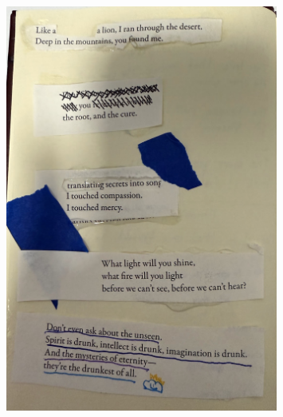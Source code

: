 \documentclass[12pt]{book}
\begin{document}
\begin{figure}
    \centering
    \includegraphics[width=0.8\textwidth]{figures/rumi_gold.png}
    \caption{\cite{gafori}}
\end{figure}
\end{document}
